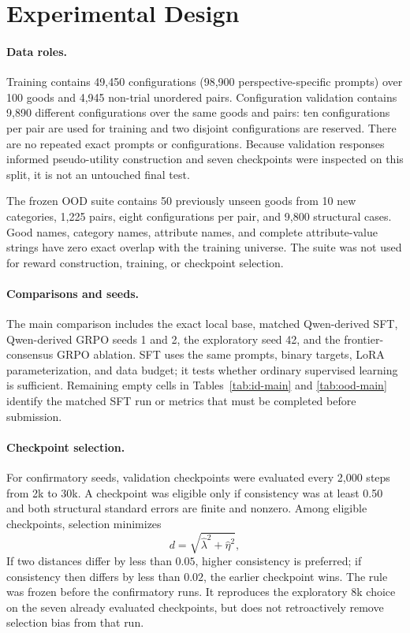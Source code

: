 \documentclass[letterpaper]{article} %
\begin{document}
\section{Experimental Design}

\paragraph{Data roles.}
Training contains 49,450 configurations (98,900 perspective-specific prompts)
over 100 goods and 4,945 non-trial unordered pairs. Configuration validation
contains 9,890 different configurations over the same goods and pairs: ten
configurations per pair are used for training and two disjoint configurations
are reserved. There are no repeated exact prompts or configurations. Because
validation responses informed pseudo-utility construction and seven
checkpoints were inspected on this split, it is not an untouched final test.

The frozen OOD suite contains 50 previously unseen goods from 10 new
categories, 1,225 pairs, eight configurations per pair, and 9,800 structural
cases. Good names, category names, attribute names, and complete
attribute-value strings have zero exact overlap with the training universe.
The suite was not used for reward construction, training, or checkpoint
selection.

\paragraph{Comparisons and seeds.}
The main comparison includes the exact local base, matched Qwen-derived SFT,
Qwen-derived GRPO seeds 1 and 2, the exploratory seed 42, and the
frontier-consensus GRPO ablation. SFT uses the same prompts, binary targets,
LoRA parameterization, and data budget; it tests whether ordinary supervised
learning is sufficient. Remaining empty cells in Tables~\ref{tab:id-main} and
\ref{tab:ood-main} identify the matched SFT run or metrics that must be
completed before submission.

\paragraph{Checkpoint selection.}
For confirmatory seeds, validation checkpoints were evaluated every 2,000 steps
from 2k to 30k. A checkpoint was eligible only if consistency was at least 0.50
and both structural standard errors are finite and nonzero. Among eligible
checkpoints, selection minimizes
\begin{equation}
d=\sqrt{\widehat\lambda^2+\widehat\eta^2},
\end{equation}
If two distances differ by less than $0.05$, higher consistency is preferred;
if consistency then differs by less than $0.02$, the earlier checkpoint wins.
The rule was frozen before the confirmatory runs. It reproduces the exploratory
8k choice on the seven already evaluated checkpoints, but does not retroactively
remove selection bias from that run.
\end{document}
